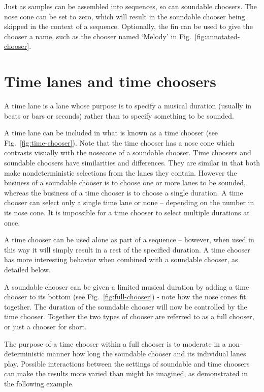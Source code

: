 \documentclass[runningheads,a4paper]{llncs}
\begin{document}
Just as samples can be assembled into sequences, so can soundable choosers. The nose cone can be set to zero, which will result in the soundable chooser being skipped in the context of a sequence. Optionally, the fin can be used to give the chooser a name, such as the chooser named `Melody' in Fig.~\ref{fig:annotated-chooser}.




\section{Time lanes and time choosers}\label{time-lanes-and-time-choosers}

A time lane is a lane whose purpose is to specify a musical duration (usually in beats or bars or seconds) rather than to specify something to be sounded. 
 
A time lane can be included in what is known as a time chooser (see Fig.~\ref{fig:time-chooser}). Note that the time chooser has a nose cone which contrasts visually with the nosecone of a soundable chooser. Time choosers and soundable choosers have similarities and differences. They are similar in that both make nondeterministic selections from the lanes they contain. However the business of a soundable chooser is to choose one or more lanes to be sounded, whereas the business of a time chooser is to choose a single duration. A time chooser can select only a single time lane or none -- depending on the number in its nose cone. It is impossible for a time chooser to select multiple durations at once.
 
A time chooser can be used alone as part of a sequence -- however, when used in this way it will simply result in a rest of the specified duration. A time chooser has more interesting behavior when combined with a soundable chooser, as detailed below.

A soundable chooser can be given a limited musical duration by adding a time chooser to its bottom (see Fig.~\ref{fig:full-chooser}) - note how the nose cones fit together. The duration of the soundable chooser will now be controlled by the time chooser. Together the two types of chooser are referred to as a full chooser, or just a chooser for short.

The purpose of a time chooser within a full chooser is to moderate in a non-deterministic manner how long the soundable chooser and its individual lanes play. Possible interactions between the settings of soundable and time choosers can make the results more varied than might be imagined, as demonstrated in the following example.
\end{document}
